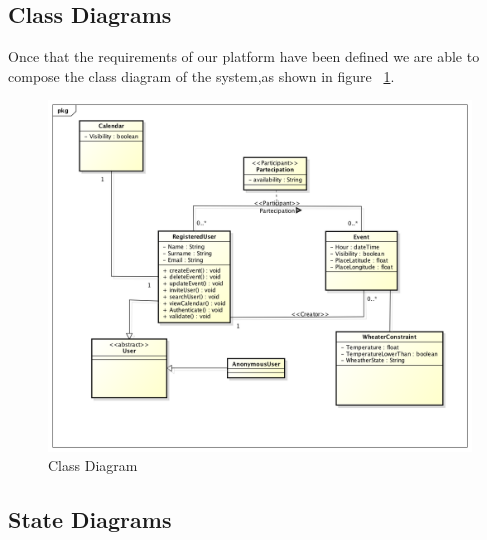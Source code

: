 \subsection{Class Diagrams}
Once that the requirements of our platform have been defined we are able to compose the class diagram  of the system,as shown in figure ~\ref{fig:classdiagram}.
\begin{center}
 \begin{figure}
    \includegraphics[width=1\textwidth]{../UMLDiagram/class/WeatherCalClassDiagram/ClassDiagram0.png}
    \caption{Class Diagram}
     \label{fig:classdiagram}
     \end{figure}
   \end{center}  
\subsection{State Diagrams}
